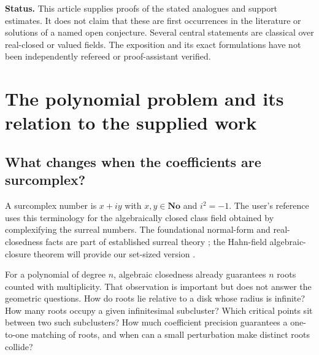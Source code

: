 \documentclass[11pt,letterpaper]{article}
\numberwithin{equation}{section}
\theoremstyle{definition}
\theoremstyle{remark}\newtheorem{remark}[theorem]{Remark}
\newcommand{\No}{\mathbf{No}}
\begin{document}
\begin{titlepage}
\begin{minipage}{0.94\textwidth}
\begin{abstract}
We prove support-controlled coprime factor lifting, an optimal
$1/n$ valuation-H\"older matching of perturbed root multisets, and
separation-sensitive simple-root stability with a second-order error estimate.
Finite quotient algebras, Hermite interpolation, resultants, and a
collision-stable residue pairing complete the algebraic picture. Examples
include nested critical scales, fractional and non-Archimedean exponents,
and a sharp collision threshold. Classical predecessors and dependencies on
the three supplied manuscripts are distinguished throughout.
\end{abstract}
\end{minipage}
\vfill
\begin{minipage}{0.94\textwidth}\small
\textbf{Status.} This article supplies proofs of the stated analogues and
support estimates. It does not claim that these are first occurrences in the
literature or solutions of a named open conjecture. Several central statements
are classical over real-closed or valued fields. The exposition and its exact
formulations have not been independently refereed or proof-assistant verified.
\end{minipage}
\end{titlepage}
\hypersetup{pageanchor=true}
{\small\tableofcontents}
\clearpage
{}

\section{The polynomial problem and its relation to the supplied work}\label{sec:intro}

\subsection{What changes when the coefficients are surcomplex?}
A surcomplex number is $x+iy$ with $x,y\in\No$ and $i^2=-1$.
The user's reference uses this terminology for the algebraically closed
class field obtained by complexifying the surreal numbers. The foundational
normal-form and real-closedness facts are part of established surreal theory
\cite{Conway,Gonshor}; the Hahn-field algebraic-closure theorem will provide our
set-sized version \cite{Poonen}.

For a polynomial of degree $n$, algebraic closedness already guarantees $n$
roots counted with multiplicity. That observation is important but does not
answer the geometric questions. How do roots lie relative to a disk whose
radius is infinite? How many roots occupy a given infinitesimal subcluster?
Which critical points sit between two such subclusters? How much coefficient
precision guarantees a one-to-one matching of roots, and when can a small
perturbation make distinct roots collide?
\end{document}
